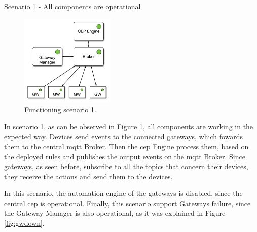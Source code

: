 \begin{Paragraph}{Scenario 1 - All components are operational}
\begin{figure}[H]
	\centering
	\includegraphics[width=0.4\textwidth]{figures/fs1.png}
	\caption{Functioning scenario 1.}
	\label{fig:fs1}
\end{figure}

In scenario 1, as can be observed in Figure \ref{fig:fs1}, all components are working in the expected way. Devices send events to the connected gateways, which fowards them to the central \ac{mqtt} Broker. Then the \ac{cep} Engine process them, based on the deployed rules and publishes the output events on the \ac{mqtt} Broker. Since gateways, as seen before, subscribe to all the topics that concern their devices, they receive the actions and send them to the devices.

In this scenario, the automation engine of the gateways is disabled, since the central \ac{cep} is operational. Finally, this scenario support Gateways failure, since the Gateway Manager is also operational, as it was explained in Figure \ref{fig:gwdown}.

\end{Paragraph}

